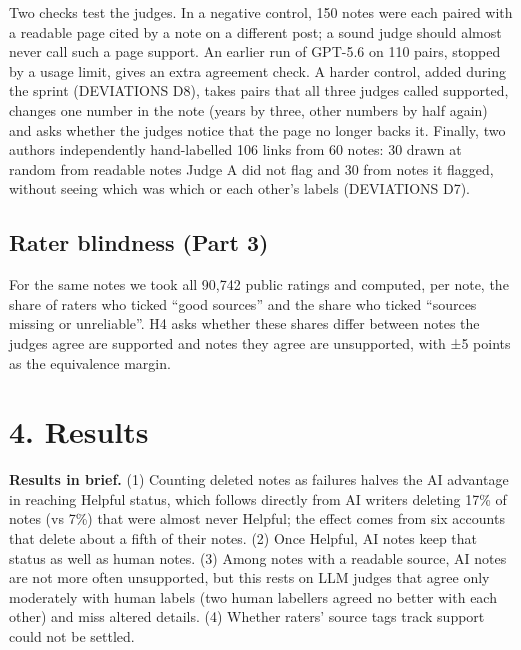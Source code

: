 \documentclass[10.5pt]{article}
\begin{document}
Two checks test the judges. In a negative control, 150 notes were each paired with a readable page cited by a note on a different post; a sound judge should almost never call such a page support. An earlier run of GPT-5.6 on 110 pairs, stopped by a usage limit, gives an extra agreement check. A harder control, added during the sprint (DEVIATIONS D8), takes pairs that all three judges called supported, changes one number in the note (years by three, other numbers by half again) and asks whether the judges notice that the page no longer backs it. Finally, two authors independently hand-labelled 106 links from 60 notes: 30 drawn at random from readable notes Judge A did not flag and 30 from notes it flagged, without seeing which was which or each other's labels (DEVIATIONS D7).

\subsection*{Rater blindness (Part 3)}
For the same notes we took all 90,742 public ratings and computed, per note, the share of raters who ticked ``good sources'' and the share who ticked ``sources missing or unreliable''. H4 asks whether these shares differ between notes the judges agree are supported and notes they agree are unsupported, with ±5 points as the equivalence margin.

\section*{4. Results}
\begin{tcolorbox}[colback=white,colframe=accent,boxrule=0.6pt,arc=2pt,left=8pt,right=8pt,top=5pt,bottom=5pt]\small{\sffamily\bfseries\color{accent} Results in brief.} (1) Counting deleted notes as failures halves the AI advantage in reaching Helpful status, which follows directly from AI writers deleting 17\% of notes (vs 7\%) that were almost never Helpful; the effect comes from six accounts that delete about a fifth of their notes. (2) Once Helpful, AI notes keep that status as well as human notes. (3) Among notes with a readable source, AI notes are not more often unsupported, but this rests on LLM judges that agree only moderately with human labels (two human labellers agreed no better with each other) and miss altered details. (4) Whether raters' source tags track support could not be settled.\end{tcolorbox}
\end{document}
